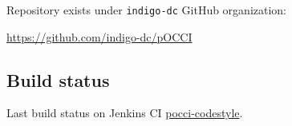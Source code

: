 \documentclass[a4wide,11pt]{article}
\begin{document}


\label{sec:repository}
Repository exists under \texttt{indigo-dc} GitHub organization: \vspace{0.1em} \begin{center}\url{https://github.com/indigo-dc/pOCCI}\end{center}



\label{sec:code_style}

\subsection{Build status}
Last build status on Jenkins CI
\href{https://jenkins.indigo-datacloud.eu:8080//job/pocci-codestyle/9}{pocci-codestyle}.


 
 

\label{sec:unit_test}
\end{document}

